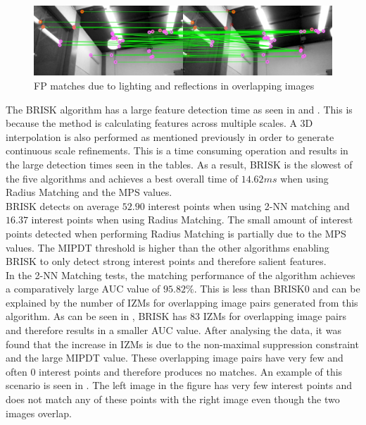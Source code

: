 \documentclass[11pt]{report}
\begin{document}
\begin{figure}
  \centering
    \includegraphics[width=1.0\textwidth]{../Drawings/Matching/reflectionsBrisk0.jpg}
    \caption{FP matches due to lighting and reflections in overlapping images} 
    \label{fig:reflectionsBrisk0}
\end{figure}


The BRISK algorithm has a large feature detection time as seen in  and . This is because the method is calculating features across multiple scales. A 3D interpolation is also performed as mentioned previously in order to generate continuous scale refinements. This is a time consuming operation and results in the large detection times seen in the tables. As a result, BRISK is the slowest of the five algorithms and achieves a best overall time of $14.62 ms$ when using Radius Matching and the MPS values.\\

BRISK detects on average $52.90$ interest points when using 2-NN matching and $16.37$ interest points when using Radius Matching. The small amount of interest points detected when performing Radius Matching is partially due to the MPS values. The MIPDT threshold is higher than the other algorithms enabling BRISK to only detect strong interest points and therefore salient features.\\

In the 2-NN Matching tests, the matching performance of the algorithm achieves a comparatively large AUC value of $95.82\%$. This is less than BRISK0 and can be explained by the number of IZMs for overlapping image pairs generated from this algorithm. As can be seen in , BRISK has $83$ IZMs for overlapping image pairs and therefore results in a smaller AUC value. After analysing the data, it was found that the increase in IZMs is due to the non-maximal suppression constraint and the large MIPDT value. These overlapping image pairs have very few and often $0$ interest points and therefore produces no matches. An example of this scenario is seen in . The left image in the figure has very few interest points and does not match any of these points with the right image even though the two images overlap.\\
\end{document}
